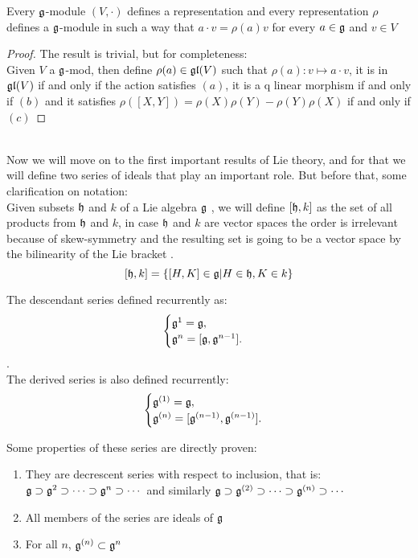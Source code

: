 \begin{prop}
	Every $\mathfrak{g}$-module $(V,\cdot)$ defines a representation and every representation $\rho$ defines a $\mathfrak{g}$-module in such a way that $a \cdot v = \rho(a)v$ for every $a \in \mathfrak{g}$ and $v \in V$
	\label{modequivrep}
\end{prop}
\begin{proof}
	The result is trivial, but for completeness:\\
	Given $V$ a $\mathfrak{g}$-mod, then define $\rho(a) \in \mathfrak{gl}(V)$ such that $\rho(a): v \mapsto a \cdot v$, it is in $\mathfrak{gl}(V)$ if and only if the action satisfies $(a)$, it is a q linear morphism if and only if $(b)$ and it satisfies $\rho([X,Y])=\rho(X)\rho(Y)-\rho(Y)\rho(X)$ if and only if $(c)$
\end{proof}\\
Now we will move on to the first important results of Lie theory, and for that we will define two series of ideals that play an important role. But before that, some clarification on notation:\\
Given subsets $\mathfrak{h}$ and $k$ of a Lie algebra $\mathfrak{g}$ , we will define $[\mathfrak{h},k]$ as the set of all products from $\mathfrak{h}$ and $k$, in case $\mathfrak{h}$ and $k$ are vector spaces the order is irrelevant because of skew-symmetry and the resulting set is going to be a vector space by the bilinearity of the Lie bracket . $$[\mathfrak{h},k] = \{[H,K] \in \mathfrak{g} | H \in \mathfrak{h}, K \in k\}$$
\begin{defi}
	The descendant series defined recurrently as:$$\begin{cases}
	\mathfrak{g}^1 = \mathfrak{g}, \\
	\mathfrak{g}^n = [\mathfrak{g},\mathfrak{g}^{n-1}].
	\end{cases}$$.\\
	The derived series is also defined recurrently: $$\begin{cases}
	\mathfrak{g}^{(1)} = \mathfrak{g},\\
	\mathfrak{g}^{(n)} = [\mathfrak{g}^{(n-1)},\mathfrak{g}^{(n-1)}].
	\end{cases}$$
	\label{13series}
\end{defi}
Some properties of these series are directly proven:
\begin{prop}
	\begin{enumerate}[label=\alph*.]
		\item They are decrescent series with respect to inclusion, that is:\\
		$\mathfrak{g} \supset \mathfrak{g}^2 \supset \cdots \supset \mathfrak{g}^n \supset \cdots $
		and similarly $\mathfrak{g} \supset \mathfrak{g}^{(2)} \supset \cdots \supset \mathfrak{g}^{(n)} \supset \cdots$
		\item All members of the series are ideals of $\mathfrak{g}$
		\item For all $n$,  $\mathfrak{g}^{(n)}\subset \mathfrak{g}^n$
	\end{enumerate}
	\label{13seriesprop}
\end{prop}
